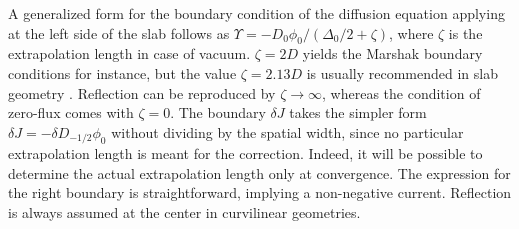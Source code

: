 \documentclass{ictt26}
\begin{document}
A generalized form for the boundary condition of the diffusion equation applying at the left side of the slab follows as $\Upsilon = - D_0 \phi_0 / (\Delta_0 / 2 + \zeta)$, where $\zeta$ is the extrapolation length in case of vacuum. $\zeta = 2D$ yields the Marshak boundary conditions for instance, but the value $\zeta = 2.13D$ is usually recommended in slab geometry \cite{stamm1983methods}. Reflection can be reproduced by $\zeta \rightarrow \infty$, whereas the condition of zero-flux comes with $\zeta = 0$. The boundary $\delta J$ takes the simpler form $\delta J = - \delta D_{-1/2} \phi_0$ without dividing by the spatial width, since no particular extrapolation length is meant for the correction. Indeed, it will be possible to determine the actual extrapolation length only at convergence. The expression for the right boundary is straightforward, implying a non-negative current. Reflection is always assumed at the center in curvilinear geometries.
\end{document}
